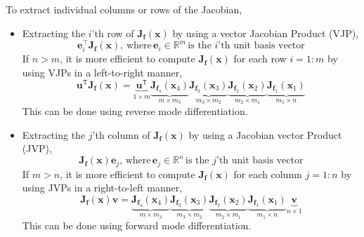 \documentclass[11pt]{article}
\begin{document}
To extract individual columns or rows of the Jacobian,
\begin{itemize}
    \item Extracting the $i$'th row of $\mathbf{J}_{\boldsymbol{f}}(\boldsymbol{x})$ by using a vector Jacobian Product (VJP),
    \[
    \boldsymbol{e}_i^\top \mathbf{J}_{\boldsymbol{f}}(\boldsymbol{x}), \, \text{where} \, \boldsymbol{e}_i \in \mathbb{R}^m \, \text{is the $i$'th unit basis vector}
    \]
    If $n > m$, it is more efficient to compute $\mathbf{J}_{\boldsymbol{f}}(\boldsymbol{x})$ for each row $i = 1 : m$ by using VJPs in a left-to-right manner,
    \[
    \boldsymbol{u}^\mathsf{T} \mathbf{J}_{\boldsymbol{f}}(\boldsymbol{x}) = \underbrace{\boldsymbol{u}^\mathsf{T}}_{1 \times m} \underbrace{\mathbf{J}_{\boldsymbol{f}_4}(\boldsymbol{x}_4)}_{m \times m_3} \underbrace{\mathbf{J}_{\boldsymbol{f}_3}(\boldsymbol{x}_3)}_{m_3 \times m_2} \underbrace{\mathbf{J}_{\boldsymbol{f}_2}(\boldsymbol{x}_2)}_{m_2 \times m_1} \underbrace{\mathbf{J}_{\boldsymbol{f}_1}(\boldsymbol{x}_1)}_{m_1 \times n}
    \]
    This can be done using reverse mode differentiation.

    \item Extracting the $j$'th column of $\mathbf{J}_{\boldsymbol{f}}(\boldsymbol{x})$ by using a Jacobian vector Product (JVP),
    \[
    \mathbf{J}_{\boldsymbol{f}}(\boldsymbol{x}) \boldsymbol{e}_j, \, \text{where} \, \boldsymbol{e}_j \in \mathbb{R}^n \, \text{is the $j$'th unit basis vector}
    \]
    If $m > n$, it is more efficient to compute $\mathbf{J}_{\boldsymbol{f}}(\boldsymbol{x})$ for each column $j = 1 : n$ by using JVPs in a right-to-left manner,
    \[
    \mathbf{J}_{\boldsymbol{f}}(\boldsymbol{x}) \boldsymbol{v} = \underbrace{\mathbf{J}_{\boldsymbol{f}_4}(\boldsymbol{x}_4)}_{m \times m_3} \underbrace{\mathbf{J}_{\boldsymbol{f}_3}(\boldsymbol{x}_3)}_{m_3 \times m_2} \underbrace{\mathbf{J}_{\boldsymbol{f}_2}(\boldsymbol{x}_2)}_{m_2 \times m_1} \underbrace{\mathbf{J}_{\boldsymbol{f}_1}(\boldsymbol{x}_1)}_{m_1 \times n} \underbrace{\boldsymbol{v}}_{n \times 1}
    \]      
    This can be done using forward mode differentiation.
\end{itemize}
\end{document}
